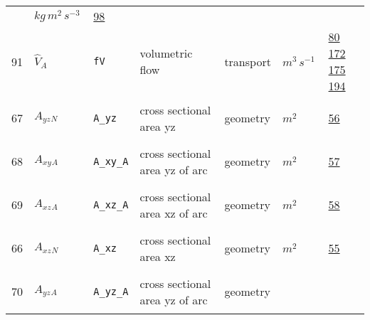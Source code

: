 \begin{longtable}{|p{1cm}|p{2.5cm}|p{4.5cm}|p{8cm}|p{3.0cm}|p{3cm}|p{1cm}|}
             & $ kg \,m^{2} \,s^{-3} \, $
             &                 \hyperlink{"e:98"}{ 98 }
                 \\
            91
             & \hypertarget{"v:91"}{ $ {{\hat{V}}}{_{A}} $}
             & \verb|fV|
             & volumetric flow
             & \begin{lay}transport \end{lay}
             & $ m^{3} \,s^{-1} \, $
             &                 \hyperlink{"e:80"}{ 80 }
                                 \hyperlink{"e:172"}{ 172 }
                                 \hyperlink{"e:175"}{ 175 }
                                 \hyperlink{"e:194"}{ 194 }
                 \\
            67
             & \hypertarget{"v:67"}{ $ {{A_{yz}}}{_{N}} $}
             & \verb|A_yz|
             & cross sectional area yz
             & \begin{lay}geometry \end{lay}
             & $ m^{2} \, $
             &                 \hyperlink{"e:56"}{ 56 }
                 \\
            68
             & \hypertarget{"v:68"}{ $ {{A_{xy}}}{_{A}} $}
             & \verb|A_xy_A|
             & cross sectional area yz of arc
             & \begin{lay}geometry \end{lay}
             & $ m^{2} \, $
             &                 \hyperlink{"e:57"}{ 57 }
                 \\
            69
             & \hypertarget{"v:69"}{ $ {{A_{xz}}}{_{A}} $}
             & \verb|A_xz_A|
             & cross sectional area xz of arc
             & \begin{lay}geometry \end{lay}
             & $ m^{2} \, $
             &                 \hyperlink{"e:58"}{ 58 }
                 \\
            66
             & \hypertarget{"v:66"}{ $ {{A_{xz}}}{_{N}} $}
             & \verb|A_xz|
             & cross sectional area xz
             & \begin{lay}geometry \end{lay}
             & $ m^{2} \, $
             &                 \hyperlink{"e:55"}{ 55 }
                 \\
            70
             & \hypertarget{"v:70"}{ $ {{A_{yz}}}{_{A}} $}
             & \verb|A_yz_A|
             & cross sectional area yz of arc
             & \begin{lay}geometry \end{lay}

\end{longtable}
